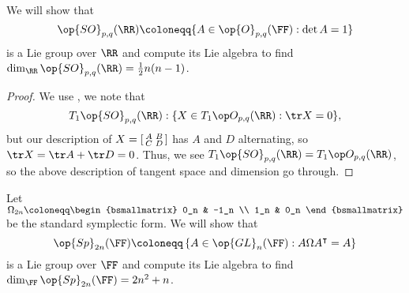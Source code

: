 \documentclass[../notes.tex]{subfiles}
\begin{document}
\begin{example}
	We will show that
	\[\op{SO}_{p,q}(\RR)\coloneqq\{A\in\op{O}_{p,q}(\FF):\det A=1\}\]
	is a Lie group over $\RR$ and compute its Lie algebra to find $\dim_\RR\op{SO}_{p,q}(\RR)=\frac12n(n-1)$.
\end{example}
\begin{proof}
	We use , we note that
	\[T_1\op{SO}_{p,q}(\RR):\{X\in T_1\op O_{p,q}(\RR):\tr X=0\},\]
	but our description of $X=\begin{bsmallmatrix}
		A & B \\ C & D
	\end{bsmallmatrix}$ has $A$ and $D$ alternating, so $\tr X=\tr A+\tr D=0$. Thus, we see $T_1\op{SO}_{p,q}(\RR)=T_1\op O_{p,q}(\RR)$, so the above description of tangent space and dimension go through.
\end{proof}
\begin{example}
	Let $\Omega_{2n}\coloneqq\begin{bsmallmatrix}
		0_n & -1_n \\
		1_n & 0_n
	\end{bsmallmatrix}$ be the standard symplectic form. We will show that
	\[\op{Sp}_{2n}(\FF)\coloneqq\left\{A\in\op{GL}_n(\FF):A\Omega A^\intercal=A\right\}\]
	is a Lie group over $\FF$ and compute its Lie algebra to find $\dim_\FF\op{Sp}_{2n}(\FF)=2n^2+n$.
\end{example}
\end{document}
